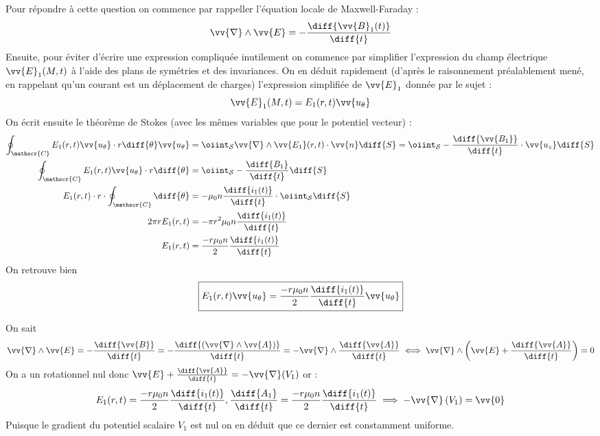 Pour répondre à cette question on commence par rappeller l'équation locale de Maxwell-Faraday :
\begin{equation}
  \vv{\nabla} \wedge \vv{E} = - \frac{\diff{\vv{B}_1 (t)}}{\diff{t}}
\end{equation}
Ensuite, pour éviter d'écrire une expression compliquée inutilement on commence par simplifier l'expression du champ électrique $\vv{E}_1 (M,t)$ à l'aide des plans de symétries et des invariances. On en déduit rapidement (d'après le raisonnement préalablement mené, en rappelant qu'un courant est un déplacement de charges) l'expression simplifiée de $\vv{E}_1$ donnée par le sujet :
\begin{equation}
  \vv{E}_1 (M,t) = E_1 (r,t) \vv{u_\theta}
\end{equation}
On écrit ensuite le théorème de Stokes (avec les mêmes variables que pour le potentiel vecteur) :
\begin{equation}
  \begin{split}
    \oint_\mathscr{C} E_1 (r,t) \vv{u_\theta} \cdot r \diff{\theta} \vv{u_\theta}
    &= \oiint_\mathcal{S} \vv{\nabla} \wedge \vv{E_1} (r,t) \cdot \vv{n} \diff{S}
    = \oiint_\mathcal{S} -\frac{\diff{\vv{B_1}}}{\diff{t}} \cdot \vv{u_z} \diff{S}\\
    \oint_\mathscr{C} E_1 (r,t) \vv{u_\theta} \cdot r \diff{\theta}
    &= \oiint_\mathcal{S} -\frac{\diff{B_1}}{\diff{t}} \diff{S}\\
    E_1 (r,t) \cdot r \cdot \oint_\mathscr{C} \diff{\theta}
    &= - \mu_0 n \frac{\diff{i_1 (t)}}{\diff{t}} \cdot \oiint_\mathcal{S}  \diff{S}\\
    2 \pi r E_1 (r,t) &= - \pi r^2 \mu_0 n \frac{\diff{i_1 (t)}}{\diff{t}}\\
    E_1 (r,t) &= \frac{-r \mu_0 n}{2} \frac{\diff{i_1 (t)}}{\diff{t}}
  \end{split}
\end{equation}
On retrouve bien
\begin{equation}
  \boxed{E_1 (r,t) \vv{u_\theta} = \frac{-r \mu_0 n}{2} \frac{\diff{i_1 (t)}}{\diff{t}} \vv{u_\theta}}
\end{equation}


On sait
\begin{equation}
  \vv{\nabla} \wedge \vv{E} = - \frac{\diff{\vv{B}}}{\diff{t}} = - \frac{ \diff{\left(\vv{\nabla} \wedge \vv{A} \right)}}{\diff{t}} = - \vv{\nabla} \wedge \frac{\diff{\vv{A}}}{\diff{t}}
  \iff
  \vv{\nabla} \wedge \left( \vv{E} + \frac{\diff{\vv{A}}}{\diff{t}} \right) = 0
\end{equation}
On a un rotationnel nul donc $\vv{E} + \frac{\diff{\vv{A}}}{\diff{t}} = - \vv{\nabla} (V_1)$ or :
\begin{equation}
  E_1 (r,t) = \frac{-r \mu_0 n}{2} \frac{\diff{i_1 (t)}}{\diff{t}}
  ,
  \frac{\diff{A_1}}{\diff{t}} = \frac{-r \mu_0 n}{2} \frac{\diff{i_1 (t)}}{\diff{t}}
  \implies
  -\vv{\nabla} \left( V_1 \right) = \vv{0}
\end{equation}
Puisque le gradient du potentiel scalaire $V_1$ est nul on en déduit que ce dernier est constamment uniforme.

